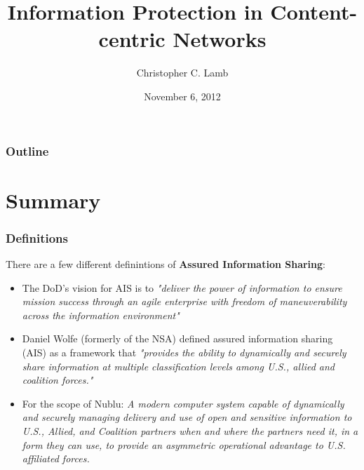 \documentclass[t,handout]{beamer}
\title{Information Protection in Content-centric Networks}
\author [Chris]{Christopher C. Lamb}
\institute[University of New Mexico]{
\inst {}Department of Electrical and Computer Engineering\\
University of New Mexico}
\date{November 6, 2012}
\begin{document}
\begin{frame}
\titlepage
\end{frame}


\begin{frame}[t]
\frametitle{Outline}
\tableofcontents 
\end{frame}

%

\section{Summary}

\begin{frame}
\frametitle{Definitions}
There are a few different definintions of {\bf Assured Information Sharing}: \\
\begin{itemize}
\item {\small The DoD's vision for AIS is to {\sl "deliver the power of information to ensure mission success through an agile enterprise with freedom of maneuverability across the information environment"}}
\item {\small Daniel Wolfe (formerly of the NSA) defined assured information sharing (AIS) as a framework that {\sl "provides the ability to dynamically and securely share information at multiple classification levels among U.S., allied and coalition forces."}}
\item {\small For the scope of Nublu: {\sl A modern computer system capable of dynamically and securely managing delivery and use of open and sensitive information to U.S., Allied, and Coalition partners when and where the partners need it, in a form they can use, to provide an asymmetric operational advantage to U.S. affiliated forces.}}
\end{itemize}
\end{frame}
\end{document}
